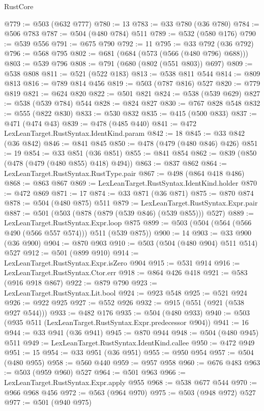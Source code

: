 \begin{lexlean}{RustCore}
\begin{coremodule}
@779 := @503 (@632 @777)
@780 := 13
@783 := @33 @780 (@36 @780)
@784 := @506 @783
@787 := @504 (@480 @784) @511
@789 := @532 (@580 @176)
@790 := @539 @556
@791 := @675 @790
@792 := 11
@795 := @33 @792 (@36 @792)
@796 := @568 @795
@802 := @681 (@684 (@573 (@566 (@480 @796) @688)))
@803 := @539 @796
@808 := @791 (@680 (@802 (@551 @803)) @697)
@809 := @538 @808
@811 := @521 (@522 @183)
@813 := @538 @811 @544
@814 := @809 @813
@816 := @789 @814 @456
@819 := @503 (@787 @816) @527
@820 := @779 @819
@821 := @624 @820
@822 := @501 @821
@824 := @538 (@539 @629)
@827 := @538 (@539 @784) @544
@828 := @824 @827
@830 := @767 @828 @548
@832 := @555 (@822 @830)
@833 := @530 @832
@835 := @415 (@500 @833)
@837 := @471 (@474 @43)
@839 := @478 (@485 @440)
@841 := @472 LexLeanTarget.RustSyntax.IdentKind.param
@842 := 18
@845 := @33 @842 (@36 @842)
@846 := @841 @845
@850 := @478 (@479 (@480 @846) @426)
@851 := 19
@854 := @33 @851 (@36 @851)
@855 := @841 @854
@862 := @839 (@850 (@478 (@479 (@480 @855) @418) @494))
@863 := @837 @862
@864 := LexLeanTarget.RustSyntax.RustType.pair
@867 := @498 (@864 @418 @486)
@868 := @863 @867
@869 := LexLeanTarget.RustSyntax.IdentKind.holder
@870 := @472 @869
@871 := 17
@874 := @33 @871 (@36 @871)
@875 := @870 @874
@878 := @504 (@480 @875) @511
@879 := LexLeanTarget.RustSyntax.Expr.pair
@887 := @501 (@503 (@878 (@879 (@539 @846) (@539 @855))) @527)
@889 := LexLeanTarget.RustSyntax.Expr.loop @875
@899 := @503 (@504 (@564 (@566 @490 (@566 @557 @574))) @511 (@539 @875))
@900 := 14
@903 := @33 @900 (@36 @900)
@904 := @870 @903
@910 := @503 (@504 (@480 @904) @511 @514) @527
@912 := @501 (@899 @910)
@914 := LexLeanTarget.RustSyntax.Expr.isZero @904
@915 := @531 @914
@916 := LexLeanTarget.RustSyntax.Ctor.err
@918 := @864 @426 @418
@921 := @583 (@916 @918 @867)
@922 := @879 @790
@923 := LexLeanTarget.RustSyntax.Lit.bool
@924 := @923 @548
@925 := @521 @924
@926 := @922 @925
@927 := @552 @926
@932 := @915 (@551 (@921 (@538 @927 @544)))
@933 := @482 @176
@935 := @504 (@480 @933)
@940 := @503 (@935 @511 (LexLeanTarget.RustSyntax.Expr.predecessor @904))
@941 := 16
@944 := @33 @941 (@36 @941)
@945 := @870 @944
@948 := @504 (@480 @945) @511
@949 := LexLeanTarget.RustSyntax.IdentKind.callee
@950 := @472 @949
@951 := 15
@954 := @33 @951 (@36 @951)
@955 := @950 @954
@957 := @504 (@480 @955)
@958 := @560 @440
@959 := @957 @958
@960 := @676 @483
@963 := @503 (@959 @960) @527
@964 := @501 @963
@966 := LexLeanTarget.RustSyntax.Expr.apply @955
@968 := @538 @677 @544
@970 := @966 @968 @456
@972 := @563 (@964 @970)
@975 := @503 (@948 @972) @527
@977 := @501 (@940 @975)

\end{coremodule}
\end{lexlean}
